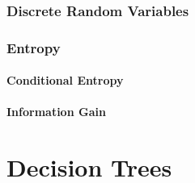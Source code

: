 \documentclass{mlnotes}
\begin{document}
\section{Discrete Random Variables}
\section{Entropy}
\subsection{Conditional Entropy}
\subsection{Information Gain}

\part{Decision Trees}

\printindex[defn]
\end{document}

